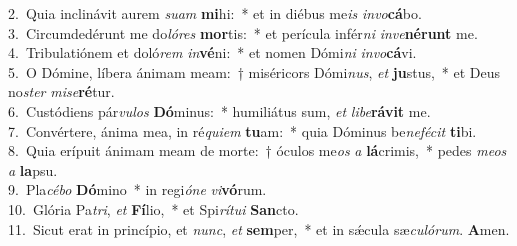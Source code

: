 {2.~}Quia inclinávit aurem \textit{su}\textit{am} \textbf{mi}hi:~* et in diébus me\textit{is} \textit{in}\textit{vo}\textbf{cá}bo.\\
{3.~}Circumdedérunt me do\textit{ló}\textit{res} \textbf{mor}tis:~* et perícula infér\textit{ni} \textit{in}\textit{ve}\textbf{né}\textbf{runt} me.\\
{4.~}Tribulatiónem et doló\textit{rem} \textit{in}\textbf{vé}ni:~* et nomen Dómi\textit{ni} \textit{in}\textit{vo}\textbf{cá}vi.\\
{5.~}O Dómine, líbera ánimam meam:~† miséricors Dómi\textit{nus}, \textit{et} \textbf{ju}stus,~* et Deus no\textit{ster} \textit{mi}\textit{se}\textbf{ré}tur.\\
{6.~}Custódiens pár\textit{vu}\textit{los} \textbf{Dó}minus:~* humiliátus sum, \textit{et} \textit{li}\textit{be}\textbf{rá}\textbf{vit} me.\\
{7.~}Convértere, ánima mea, in ré\textit{qui}\textit{em} \textbf{tu}am:~* quia Dóminus be\textit{ne}\textit{fé}\textit{cit} \textbf{ti}bi.\\
{8.~}Quia erípuit ánimam meam de morte:~† óculos me\textit{os} \textit{a} \textbf{lá}crimis,~* pedes \textit{me}\textit{os} \textit{a} \textbf{la}psu.\\
{9.~}Pla\textit{cé}\textit{bo} \textbf{Dó}mino~* in regi\textit{ó}\textit{ne} \textit{vi}\textbf{vó}rum.\\
{10.~}Glória Pa\textit{tri}, \textit{et} \textbf{Fí}lio,~* et Spi\textit{rí}\textit{tu}\textit{i} \textbf{San}cto.\\
{11.~}Sicut erat in princípio, et \textit{nunc}, \textit{et} \textbf{sem}per,~* et in sǽcula sæ\textit{cu}\textit{ló}\textit{rum}. \textbf{A}men.\\

